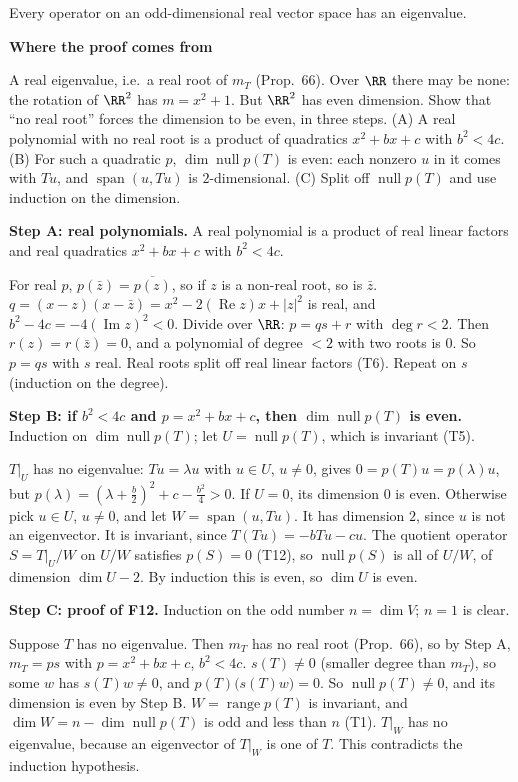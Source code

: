 \documentclass[10pt]{scrartcl}
\DeclareMathOperator{\nul}{null}
\DeclareMathOperator{\range}{range}
\DeclareMathOperator{\spn}{span}
\newenvironment{motive}{\begin{mdframed}[style=thinkbox]\textbf{\color{OliveGreen!75!black}Where the proof comes from}\begin{description}[leftmargin=0.9em,labelindent=0pt,itemsep=2pt,topsep=2pt,font=\normalfont\bfseries\color{OliveGreen!70!black}]}{\end{description}\end{mdframed}}
\newenvironment{steps}{\begin{enumerate}[label=\arabic*.,leftmargin=1.5em,itemsep=2pt,topsep=2pt]}{\end{enumerate}}
\begin{document}
\begin{proposition*}
  Every operator on an odd-dimensional real vector space has an eigenvalue.
\end{proposition*}
\begin{motive}
  \ii[Want.] A real eigenvalue, i.e.\ a real root of $m_T$ (Prop.~66).
  \ii[Know.] Over $\RR$ there may be none: the rotation of $\RR^2$ has $m=x^2+1$. But $\RR^2$ has even dimension.
  \ii[Plan.] Show that ``no real root'' forces the dimension to be even, in three steps. (A) A real polynomial with no real root is a product of quadratics $x^2+bx+c$ with $b^2<4c$. (B) For such a quadratic $p$, $\dim\nul p(T)$ is even: each nonzero $u$ in it comes with $Tu$, and $\spn(u,Tu)$ is $2$-dimensional. (C) Split off $\nul p(T)$ and use induction on the dimension.
\end{motive}
\textbf{Step A: real polynomials.} A real polynomial is a product of real linear factors and real quadratics $x^2+bx+c$ with $b^2<4c$.
\begin{steps}
  \ii For real $p$, $p(\bar z)=\overline{p(z)}$, so if $z$ is a non-real root, so is $\bar z$.
  \ii $q=(x-z)(x-\bar z)=x^2-2(\operatorname{Re}z)x+|z|^2$ is real, and $b^2-4c=-4(\operatorname{Im}z)^2<0$.
  \ii Divide over $\RR$: $p=qs+r$ with $\deg r<2$. Then $r(z)=r(\bar z)=0$, and a polynomial of degree $<2$ with two roots is $0$. So $p=qs$ with $s$ real. Real roots split off real linear factors (T6). Repeat on $s$ (induction on the degree).
\end{steps}
\textbf{Step B: if $b^2<4c$ and $p=x^2+bx+c$, then $\dim\nul p(T)$ is even.} Induction on $\dim\nul p(T)$; let $U=\nul p(T)$, which is invariant (T5).
\begin{steps}
  \ii $T|_U$ has no eigenvalue: $Tu=\lambda u$ with $u\in U$, $u\ne0$, gives $0=p(T)u=p(\lambda)u$, but $p(\lambda)=(\lambda+\frac b2)^2+c-\frac{b^2}4>0$.
  \ii If $U=0$, its dimension $0$ is even. Otherwise pick $u\in U$, $u\ne0$, and let $W=\spn(u,Tu)$. It has dimension $2$, since $u$ is not an eigenvector. It is invariant, since $T(Tu)=-bTu-cu$.
  \ii The quotient operator $S=T|_U/W$ on $U/W$ satisfies $p(S)=0$ (T12), so $\nul p(S)$ is all of $U/W$, of dimension $\dim U-2$. By induction this is even, so $\dim U$ is even.
\end{steps}
\textbf{Step C: proof of F12.} Induction on the odd number $n=\dim V$; $n=1$ is clear.
\begin{steps}
  \ii Suppose $T$ has no eigenvalue. Then $m_T$ has no real root (Prop.~66), so by Step A, $m_T=ps$ with $p=x^2+bx+c$, $b^2<4c$.
  \ii $s(T)\ne0$ (smaller degree than $m_T$), so some $w$ has $s(T)w\ne0$, and $p(T)\bigl(s(T)w\bigr)=0$. So $\nul p(T)\ne0$, and its dimension is even by Step B.
  \ii $W=\range p(T)$ is invariant, and $\dim W=n-\dim\nul p(T)$ is odd and less than $n$ (T1). $T|_W$ has no eigenvalue, because an eigenvector of $T|_W$ is one of $T$. This contradicts the induction hypothesis.
\end{steps}
\end{document}
